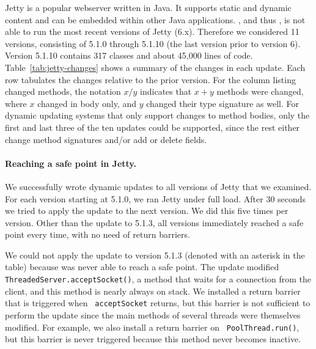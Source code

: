 Jetty is a popular webserver written in Java. It supports static
and dynamic content and can be embedded 
within other Java applications. \JikesRVM, and thus \DSU, is not able to run the
most recent versions of Jetty (6.x).  Therefore we considered 11
versions, consisting of 5.1.0 through 5.1.10 (the last version prior to
version 6).  Version 5.1.10 contains 317 classes and about 45,000 lines
of code.  Table~\ref{tab:jetty-changes} shows a summary of the changes
in each update.  Each row tabulates the changes relative
to the prior version. For the column listing changed methods, the
notation $x/y$ indicates that $x+y$ methods were changed, where $x$
changed in body only, and $y$ changed their type signature as well.
For dynamic updating systems that only support changes to method
bodies, only the first and last three of the ten updates could be
supported, since the rest either change method signatures
and/or add or delete fields.

\paragraph{Reaching a safe point in Jetty.}
We  successfully wrote dynamic updates to all
versions of Jetty that we examined. For each version starting at 5.1.0, we ran
Jetty under full load. After 30 seconds we tried to apply the update to the
next version. We did this five times per version.  Other than the
update to 5.1.3, all versions immediately 
reached a safe point every time, with no need of return barriers.

We could not apply the update to version 5.1.3 (denoted with an
asterisk in the table) 
because \DSU{} was never able to reach a safe point. The update modified
{\tt ThreadedServer.accept\-Socket()}, a method that waits for a connection
from the client, and this method is nearly always on stack. 
We installed a return barrier that is triggered when {\tt
  acceptSocket} returns, but this barrier is not sufficient to perform the
update since the main methods of several threads were themselves
modified. For example, we also install a return barrier on {\tt
  Pool\-Thread.run()}, but this barrier is never triggered because
this method never becomes inactive.


